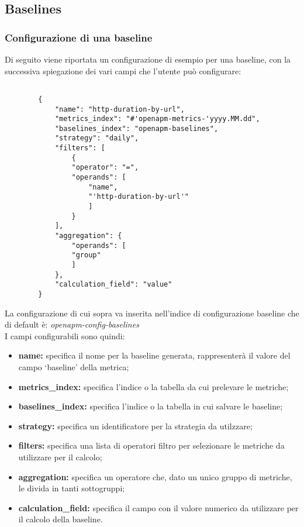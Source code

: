 \subsection{Baselines}

	\subsubsection{Configurazione di una baseline}

	Di seguito viene riportata un configurazione di esempio per una baseline, con la successiva spiegazione dei vari campi che l'utente può configurare:

	\begin{lstlisting}[style=json]

		{
			"name": "http-duration-by-url",
			"metrics_index": "#'openapm-metrics-'yyyy.MM.dd",
			"baselines_index": "openapm-baselines",
			"strategy": "daily",
			"filters": [
				{
				"operator": "=",
				"operands": [
					"name",
					"'http-duration-by-url'"
					]
				}
			],
			"aggregation": {
				"operands": [
				"group"
				]
			},
			"calculation_field": "value"
		}
	\end{lstlisting}

	La configurazione di cui sopra va inserita nell'indice di configurazione baseline che di default è: \textit{openapm-config-baselines} \\
	I campi configurabili sono quindi:

	\begin{itemize}
                \item \textbf{name:} specifica il nome per la baseline generata, rappresenterà il valore del campo `baseline' della metrica;
                \item \textbf{metrics\_index:} specifica l'indice o la tabella da cui prelevare le metriche;
                \item \textbf{baselines\_index:} specifica l'indice o la tabella in cui salvare le baseline;
                \item \textbf{strategy:} specifica un identificatore per la strategia da utilzzare;
                \item \textbf{filters:} specifica una lista di operatori filtro per selezionare le metriche da utilizzare per il calcolo;
                \item \textbf{aggregation:} specifica un operatore che, dato un unico gruppo di metriche, le divida in tanti sottogruppi;
                \item \textbf{calculation\_field:} specifica il campo con il valore numerico da utilizzare per il calcolo della baseline.
	\end{itemize}

